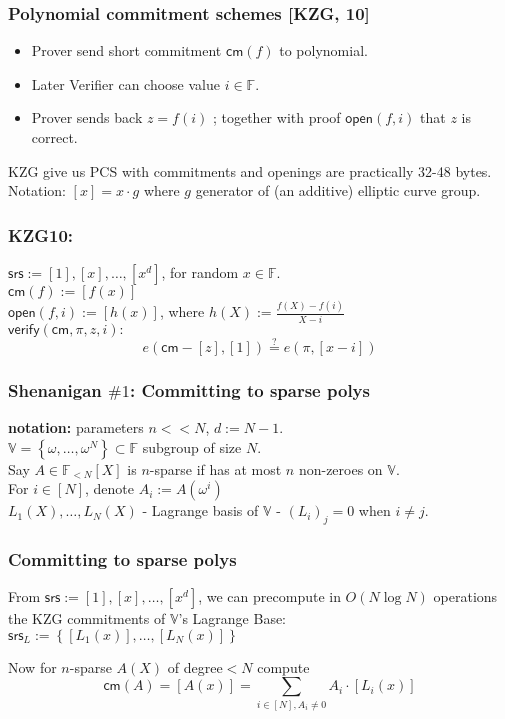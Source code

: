 \documentclass[shadesubsections,compress,14pt,mathserif]{beamer}
\newcommand{\F}{\ensuremath{{\mathbb F}}}
\newcommand{\set}[1]{\ensuremath{\left\{#1\right\}}}
\newcommand{\enc}[1]{\ensuremath{\left[#1\right ]}}
\newcommand{\kzg}[1]{\ensuremath{\enc{#1(x)}}}
\newcommand{\cm}{\ensuremath{\mathsf{cm}}}
\newcommand{\open}[1]{\ensuremath{\mathsf{open}(#1)}}
\newcommand{\verify}[1]{\ensuremath{\mathsf{verify}(#1)}}
\newcommand{\defeq}{\ensuremath{:=}}
\newcommand{\polysofdeg}[1]{\F_{< #1}[X]}
\newcommand{\nl}{\\ \pause \vspace{0.2in}}
\newcommand{\srs}{\ensuremath{\mathsf{srs}}}
\newcommand{\bigspace}{\ensuremath{\mathbb{V}}}
\begin{document}
\begin{frame}
 \frametitle{Polynomial commitment schemes {\small [KZG, 10]}}   %
\begin{itemize}
 \item Prover send short commitment $\cm(f)$ to polynomial.\pause
 \item Later Verifier can choose value $i\in \F$.\pause
 \item Prover sends back $z=f(i)$ ; together with proof $\open{f,i}$ that $z$ is correct.\pause
\end{itemize}
KZG give us PCS with commitments and openings are practically 32-48 bytes.\\ 
Notation: $\enc{x}=x\cdot g$ where $g$ generator of (an additive) elliptic curve group.
\end{frame}
\begin{frame}
\frametitle{KZG10:}
 $\srs \defeq \enc{1},\enc{x},\ldots,\enc{x^d}$, for random $x\in \F$.\\ \pause
 \vspace{0.4in}
 $\cm(f)\defeq   \enc{f(x)}$\\ \pause
 \vspace{0.4in}
$\open{f,i}\defeq \enc{h(x)}$, where
 $h(X)\defeq \frac{f(X)-f(i)}{X-i}$\\ \pause
 \vspace{0.4in}
 $\verify{\cm,\pi,z,i}:$
\[e(\cm-\enc{z},\enc{1}) \stackrel{?}{=} e(\pi, \enc{x-i})\]
\end{frame}

\begin{frame}
 \frametitle{Shenanigan $\#1$: Committing to sparse polys}
\textbf{notation:} parameters $n<<N$, $d\defeq N-1$.
 \\
 \vspace{0.4in}
 $\bigspace=\set{\omega,\ldots,\omega^N}\subset \F$ subgroup of size $N$.\nl
Say $A\in \polysofdeg{N}$  is $n$-sparse if has at most $n$ non-zeroes on $\bigspace$.\nl
For $i\in [N]$, denote $A_i\defeq A(\omega^i)$\\
$L_1(X),\ldots,L_N(X)$ - Lagrange basis of $\bigspace$ - $(L_i)_j=0$ when $i\neq j$.
\end{frame}

\begin{frame}
 \frametitle{Committing to sparse polys}
From $\srs \defeq \enc{1},\enc{x},\ldots,\enc{x^d}$, we can precompute in $O(N\log N)$ operations 
the KZG commitments of $\bigspace$'s Lagrange Base:\\
$\srs_L \defeq \set{\enc{L_1(x)},\ldots,\enc{L_N(x)}}$\nl

Now for $n$-sparse $A(X)$ of degree$<N$ compute 
\[\cm(A)=\enc{A(x)}=\sum_{i\in [N], A_i\neq 0} A_i\cdot \kzg{L_i}
\]

\end{frame}
 
\end{document}
